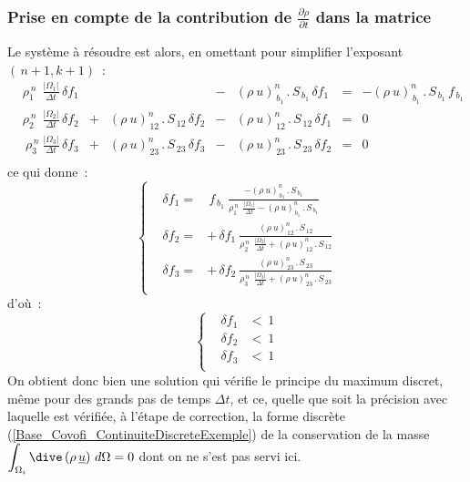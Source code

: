 \subsubsection*{Prise en compte de la contribution de
$\displaystyle\frac{\partial \rho}{\partial t}$ dans la matrice}
\label{Base_Covofi_PpmaxAvecDrhoDt}
Le système à résoudre est alors, en omettant pour simplifier l'exposant $(\,n+1,k+1)$~:
\begin{equation}
\begin{array}{lllllllll}
&\displaystyle \rho_1^{\,n}\ \displaystyle\ \frac{|\Omega_1|}{\Delta
t}\,\delta f_1&&\ \ \ \ \ \ \ \    &-&(\rho\ u)^n_{\,b_1}\,.\,S_{\,b_1}\,\delta
f_1 &= &-(\rho\ u)^n_{\,b_1}\,.\,S_{\,b_1}\,f_{\,b_1}\\
&\displaystyle\rho_2^{\,n}\ \displaystyle\ \frac{|\Omega_2|}{\Delta
t}\,\delta f_2 &+&(\rho\ u)^n_{\,12}\,.\,S_{\,12}\,\delta f_2  &-&(\rho\
u)^n_{\,12}\,.\,S_{\,12}\,\delta f_1 &= &0\\
&\displaystyle\ \rho_3^{\,n} \displaystyle\ \frac{|\Omega_3|}{\Delta
t}\,\delta f_3 &+&(\rho\ u)^n_{\,23}\,.\,S_{\,23}\,\delta f_3 &-&(\rho\
u)^n_{\,23}\,.\,S_{\,23}\,\delta f_2 &= &0\\
\end{array}
\end{equation}
ce qui donne~:
\begin{equation}
\left\{\begin{array}{lll}
&\delta f_1 =& \,f_{\,b_1}\displaystyle\ \frac{-(\rho\ u)^n_{\,b_1}\,.\,S_{\,b_1}}{\rho_1^{\,n}\ \displaystyle\ \frac{|\Omega_1|}{\Delta
t} - (\rho\ u)^n_{\,b_1}\,.\,S_{\,b_1}}\\
&\delta f_2 =&+ \,\delta f_1 \displaystyle\ \frac{(\rho\
u)^n_{\,12}\,.\,S_{\,12}}{\rho_2^{\,n}\ \displaystyle\ \frac{|\Omega_2|}{\Delta t} + (\rho\ u)^n_{\,12}\,.\,S_{\,12}}\\
&\delta f_3 =&+ \,\delta f_2 \displaystyle\ \frac{(\rho\
u)^n_{\,23}\,.\,S_{\,23}}{\rho_3^{\,n}\ \displaystyle\ \frac{|\Omega_3|}{\Delta
t} + (\rho\ u)^n_{\,23}\,.\,S_{\,23}}\\
\end{array}\right.
\end{equation}
d'où~:
\begin{equation}
\left\{\begin{array}{lll}
& \delta f_1 & <\ 1 \\
& \delta f_2 & <\ 1 \\
& \delta f_3 & <\ 1 \\
\end{array}\right.
\end{equation}
On obtient donc bien une solution qui vérifie le principe du maximum discret,
même pour des grands pas de temps $\Delta t$, et ce, quelle que soit la
précision avec laquelle est vérifiée, à l'étape de correction, la
forme discrète (\ref{Base_Covofi_ContinuiteDiscreteExemple}) de la conservation de la
masse $\displaystyle\int_{\Omega_i}\dive\,(\rho\,\underline{u})\ d\Omega = 0$
dont on ne s'est pas servi ici.



